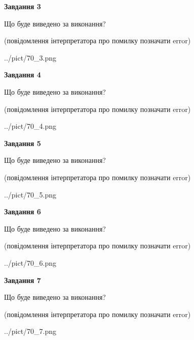\documentclass[12pt, ukrainian]{article}
\begin{document}
{\begin {large}
{\begin {center}\textbf{Завдання 3}\end {center}}\par
Що буде виведено за виконання?\par
 (повідомлення інтерпретатора про помилку позначати error)\par
\begin{center}
	{../pict/70_3.png}
\end{center}
\newpage

{\begin {center}\textbf{Завдання 4}\end {center}}\par
Що буде виведено за виконання?\par
 (повідомлення інтерпретатора про помилку позначати error)\par
\begin{center}
	{../pict/70_4.png}
\end{center}
\newpage

{\begin {center}\textbf{Завдання 5}\end {center}}\par
Що буде виведено за виконання?\par
 (повідомлення інтерпретатора про помилку позначати error)\par
\begin{center}
	{../pict/70_5.png}
\end{center}
\newpage

{\begin {center}\textbf{Завдання 6}\end {center}}\par
Що буде виведено за виконання?\par
 (повідомлення інтерпретатора про помилку позначати error)\par
\begin{center}
	{../pict/70_6.png}
\end{center}
\newpage

{\begin {center}\textbf{Завдання 7}\end {center}}\par
Що буде виведено за виконання?\par
 (повідомлення інтерпретатора про помилку позначати error)\par
\begin{center}
	{../pict/70_7.png}
\end{center}
\newpage


\end{large}}
\end{document}
